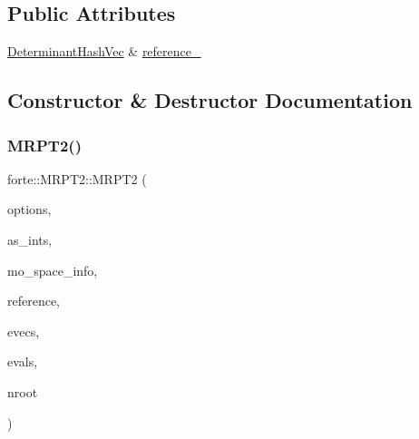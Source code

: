 \subsection*{Public Attributes}
\begin{DoxyCompactItemize}
\item 
\mbox{\hyperlink{classforte_1_1_determinant_hash_vec}{Determinant\+Hash\+Vec}} \& \mbox{\hyperlink{classforte_1_1_m_r_p_t2_a959fbe9322dc2f53d0daf9ba7ffdeac5}{reference\+\_\+}}
\end{DoxyCompactItemize}


\subsection{Constructor \& Destructor Documentation}
\mbox{\label{classforte_1_1_m_r_p_t2_a2d90725ec7359be7d44657dae00d6354}} 
\subsubsection{\texorpdfstring{M\+R\+P\+T2()}{MRPT2()}}
{\footnotesize\ttfamily forte\+::\+M\+R\+P\+T2\+::\+M\+R\+P\+T2 (\begin{DoxyParamCaption}\item[{std\+::shared\+\_\+ptr$<$ \mbox{\hyperlink{classforte_1_1_forte_options}{Forte\+Options}} $>$}]{options,  }\item[{std\+::shared\+\_\+ptr$<$ \mbox{\hyperlink{classforte_1_1_active_space_integrals}{Active\+Space\+Integrals}} $>$}]{as\+\_\+ints,  }\item[{std\+::shared\+\_\+ptr$<$ \mbox{\hyperlink{classforte_1_1_m_o_space_info}{M\+O\+Space\+Info}} $>$}]{mo\+\_\+space\+\_\+info,  }\item[{\mbox{\hyperlink{classforte_1_1_determinant_hash_vec}{Determinant\+Hash\+Vec}} \&}]{reference,  }\item[{psi\+::\+Shared\+Matrix}]{evecs,  }\item[{psi\+::\+Shared\+Vector}]{evals,  }\item[{int}]{nroot }\end{DoxyParamCaption})}

\mbox{\label{classforte_1_1_m_r_p_t2_a1359d7cf1e445799d7fc3f25db567971}} 
